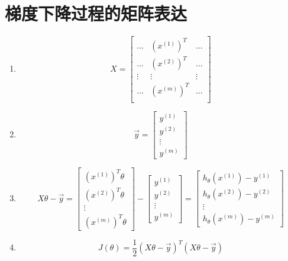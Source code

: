 \section{梯度下降过程的矩阵表达}
\begin{enumerate}
	\item 
	\begin{equation}
		X = \left[\begin{matrix}
		\ldots & (x^{(1)})^T & \ldots \\
		\ldots & (x^{(2)})^T & \ldots \\
		\vdots & \vdots & \vdots \\
		\ldots & (x^{(m)})^T & \ldots \\
		\end{matrix}\right]
	\end{equation}

	\item 
	\begin{equation}
		\vec{y} = \left[\begin{matrix}
		y^{(1)} \\ y^{(2)} \\ \vdots \\ y^{(m)}
		\end{matrix}\right]
	\end{equation}

	\item 
	\begin{equation}
		X\theta - \vec{y} = \left[\begin{matrix}
		(x^{(1)})^T\theta \\ (x^{(2)})^T\theta \\ \vdots \\ (x^{(m)})^T\theta
		\end{matrix}\right] - \left[\begin{matrix}
		y^{(1)} \\ y^{(2)} \\ \vdots \\ y^{(m)}
		\end{matrix}\right] = \left[\begin{matrix}
		h_\theta(x^{(1)}) - y^{(1)} \\ h_\theta(x^{(2)}) - y^{(2)} \\ \vdots \\ h_\theta(x^{(m)}) - y^{(m)}
		\end{matrix}\right]
	\end{equation}

	\item 
	\begin{equation}
		J(\theta) = \frac{1}{2}(X\theta - \vec{y})^T(X\theta - \vec{y})
	\end{equation}


\end{enumerate}
